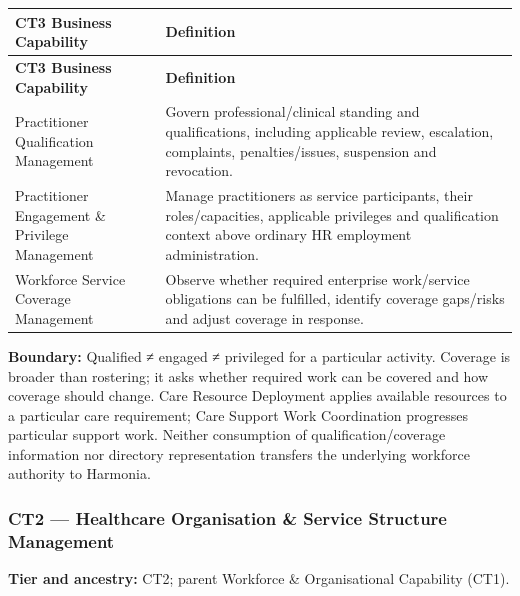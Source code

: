 \label{rad:business:924}
\begingroup\small\setlength{\TableWidth}{\dimexpr\linewidth-4\tabcolsep-3\arrayrulewidth\relax}
\begin{longtable}{|>{\raggedright\arraybackslash}p{0.35\TableWidth}|>{\raggedright\arraybackslash}p{0.65\TableWidth}|}
\hline\rowcolor{TableHead}\textbf{CT3 Business Capability} & \textbf{Definition}\\\hline\endfirsthead
\hline\rowcolor{TableHead}\textbf{CT3 Business Capability} & \textbf{Definition}\\\hline\endhead
\hline\endfoot
Practitioner Qualification Management & Govern professional/\allowbreak{}clinical standing and qualifications, including applicable review, escalation, complaints, penalties/\allowbreak{}issues, suspension and revocation.\\\hline
Practitioner Engagement \& Privilege Management & Manage practitioners as service participants, their roles/\allowbreak{}capacities, applicable privileges and qualification context above ordinary HR employment administration.\\\hline
Workforce Service Coverage Management & Observe whether required enterprise work/\allowbreak{}service obligations can be fulfilled, identify coverage gaps/\allowbreak{}risks and adjust coverage in response.\\\hline
\end{longtable}\endgroup
{}\label{rad:business:930}

\textbf{Boundary:} Qualified ≠ engaged ≠ privileged for a particular activity. Coverage is broader than rostering; it asks whether required work can be covered and how coverage should change. Care Resource Deployment applies available resources to a particular care requirement; Care Support Work Coordination progresses particular support work. Neither consumption of qualification/\allowbreak{}coverage information nor directory representation transfers the underlying workforce authority to Harmonia.

\label{rad:business:932}
\subsubsection*{CT2 — Healthcare Organisation \& Service Structure Management}
\label{rad:business:934}

\textbf{Tier and ancestry:} CT2; parent Workforce \& Organisational Capability (CT1).

\label{rad:business:936}

